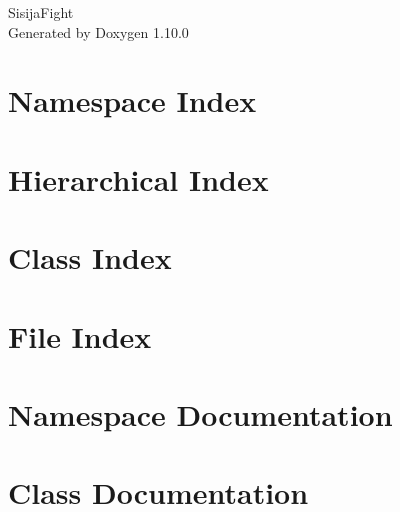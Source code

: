 \documentclass[twoside]{book}
\newcommand{\+}{\discretionary{\mbox{\scriptsize$\hookleftarrow$}}{}{}}
\newcommand{\clearemptydoublepage}{%
    \newpage{\pagestyle{empty}\cleardoublepage}%
  }
\begin{document}
  \raggedbottom
    \hypersetup{pageanchor=false,
                bookmarksnumbered=true,
                pdfencoding=unicode
               }
  \begin{titlepage}
  \vspace*{7cm}
  \begin{center}%
  {\Large Sisija\+Fight}\\
  \vspace*{1cm}
  {\large Generated by Doxygen 1.10.0}\\
  \end{center}
  \end{titlepage}
  \clearemptydoublepage
  \tableofcontents
  \clearemptydoublepage
  \hypersetup{pageanchor=true}
\chapter{Namespace Index}

\chapter{Hierarchical Index}

\chapter{Class Index}

\chapter{File Index}

\chapter{Namespace Documentation}

\chapter{Class Documentation}

































\end{document}
